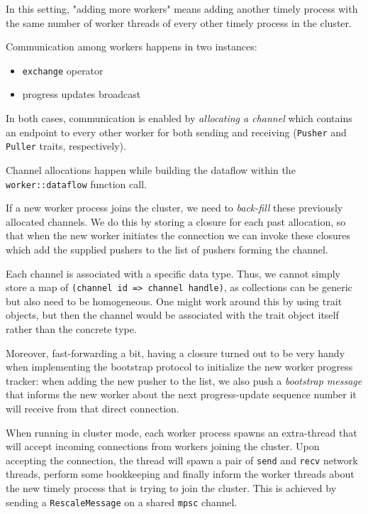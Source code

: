 \documentclass[12pt]{extarticle}
\begin{document}
In this setting, "adding more workers" means adding another timely process with the same number of worker threads
of every other timely process in the cluster.

Communication among workers happens in two instances:
\begin{itemize}
    \item \verb|exchange| operator
    \item progress updates broadcast
\end{itemize}

In both cases, communication is enabled by \textit{allocating a channel} which contains an endpoint to every other worker
for both sending and receiving (\verb|Pusher| and \verb|Puller| traits, respectively).

Channel allocations happen while building the dataflow within the \verb|worker::dataflow| function call.

If a new worker process joins the cluster, we need to \textit{back-fill} these previously allocated channels.
We do this by storing a closure for each past allocation, so that when the new worker initiates the connection
we can invoke these closures which add the supplied pushers to the list of pushers forming the channel.

Each channel is associated with a specific data type.
Thus, we cannot simply store a map of \verb|(channel id => channel handle)|, as collections can be generic but also need to be homogeneous.
One might work around this by using trait objects, but then the channel would be associated with the trait object itself rather than the concrete
type.

Moreover, fast-forwarding a bit, having a closure turned out to be very handy when implementing the bootstrap protocol to initialize the new worker
progress tracker: when adding the new pusher to the list, we also push a \textit{bootstrap message} that informs the new worker about the next
progress-update sequence number it will receive from that direct connection.


\vspace{3mm}
\noindent
When running in cluster mode, each worker process spawns an extra-thread that will accept incoming connections from workers joining the cluster.
Upon accepting the connection, the thread will spawn a pair of \verb|send| and \verb|recv| network threads, perform some bookkeeping and
finally inform the worker threads about the new timely process that is trying to join the cluster.
This is achieved by sending a \verb|RescaleMessage| on a shared \verb|mpsc| channel.
\end{document}
